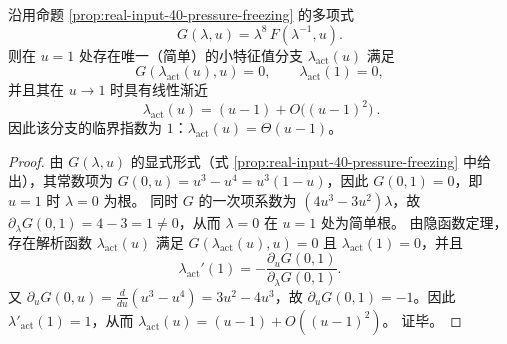 \begin{proposition}\label{prop:real-input-40-activated-branch-linear}
沿用命题 \ref{prop:real-input-40-pressure-freezing} 的多项式
\[
G(\lambda,u)=\lambda^8\,F(\lambda^{-1},u).
\]
则在 \(u=1\) 处存在唯一（简单）的小特征值分支 \(\lambda_{\mathrm{act}}(u)\) 满足
\[
G(\lambda_{\mathrm{act}}(u),u)=0,\qquad \lambda_{\mathrm{act}}(1)=0,
\]
并且其在 \(u\to 1\) 时具有线性渐近
\[
\boxed{\ \lambda_{\mathrm{act}}(u)=(u-1)+O\!\bigl((u-1)^2\bigr)\ }.
\]
因此该分支的临界指数为 \(1\)：\(\lambda_{\mathrm{act}}(u)=\Theta(u-1)\)。
\end{proposition}
\begin{proof}
由 \(G(\lambda,u)\) 的显式形式（式 \eqref{prop:real-input-40-pressure-freezing} 中给出），其常数项为
\(
G(0,u)=u^3-u^4=u^3(1-u)
\)，因此 \(G(0,1)=0\)，即 \(u=1\) 时 \(\lambda=0\) 为根。
同时 \(G\) 的一次项系数为 \((4u^3-3u^2)\lambda\)，故
\(
\partial_\lambda G(0,1)=4-3=1\neq 0
\)，从而 \(\lambda=0\) 在 \(u=1\) 处为简单根。
由隐函数定理，存在解析函数 \(\lambda_{\mathrm{act}}(u)\) 满足 \(G(\lambda_{\mathrm{act}}(u),u)=0\) 且 \(\lambda_{\mathrm{act}}(1)=0\)，并且
\[
\lambda_{\mathrm{act}}'(1)=-\frac{\partial_u G(0,1)}{\partial_\lambda G(0,1)}.
\]
又 \(\partial_u G(0,u)=\frac{d}{du}(u^3-u^4)=3u^2-4u^3\)，故 \(\partial_u G(0,1)=-1\)。因此 \(\lambda'_{\mathrm{act}}(1)=1\)，从而
\(
\lambda_{\mathrm{act}}(u)=(u-1)+O((u-1)^2)
\)。
证毕。
\end{proof}



